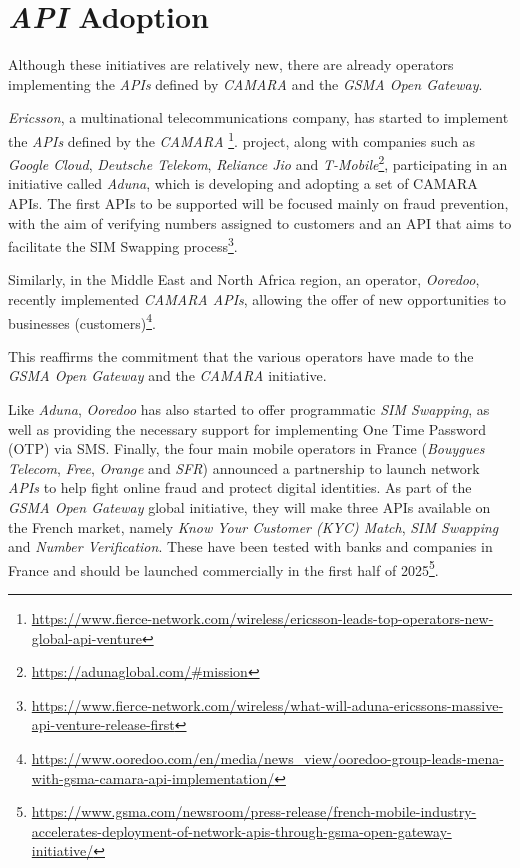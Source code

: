 \section{\emph{API} Adoption} Although these initiatives are
relatively new, there are already operators implementing the
\emph{APIs} defined by \emph{CAMARA} and the \emph{GSMA Open
Gateway}.

\emph{Ericsson}, a multinational telecommunications company, has
started to implement the \emph{APIs} defined by the \emph{CAMARA}
\footnote{\url{https://www.fierce-network.com/wireless/ericsson-leads-top-operators-new-global-api-venture}}.
project, along with companies such as \emph{Google Cloud},
\emph{Deutsche Telekom}, \emph{Reliance Jio} and
\emph{T-Mobile}\footnote{\url{https://adunaglobal.com/\#mission}},
participating in an initiative called \emph{Aduna}, which is
developing and adopting a set of CAMARA APIs. The first APIs to
be supported will be focused mainly on fraud prevention, with the
aim of verifying numbers assigned to customers and an API that
aims to facilitate the SIM Swapping
process\footnote{\url{https://www.fierce-network.com/wireless/what-will-aduna-ericssons-massive-api-venture-release-first}}.

Similarly, in the Middle East and North Africa region, an
operator, \emph{Ooredoo}, recently implemented \emph{CAMARA
APIs}, allowing the offer of new opportunities to businesses
(customers)\footnote{\url{https://www.ooredoo.com/en/media/news_view/ooredoo-group-leads-mena-with-gsma-camara-api-implementation/}}.

This reaffirms the commitment that the various operators have
made to the \emph{GSMA Open Gateway} and the \emph{CAMARA}
initiative.

Like \emph{Aduna}, \emph{Ooredoo} has also started to offer
programmatic \emph{SIM Swapping}, as well as providing the
necessary support for implementing One Time Password (OTP) via
SMS. Finally, the four main mobile operators in France
(\emph{Bouygues Telecom}, \emph{Free}, \emph{Orange} and
\emph{SFR}) announced a partnership to launch network \emph{APIs}
to help fight online fraud and protect digital identities. As
part of the \emph{GSMA Open Gateway} global initiative, they will
make three APIs available on the French market, namely \emph{Know
Your Customer (KYC) Match}, \emph{SIM Swapping} and \emph{Number
Verification}. These have been tested with banks and companies in
France and should be launched commercially in the first half of
2025\footnote{\url{https://www.gsma.com/newsroom/press-release/french-mobile-industry-accelerates-deployment-of-network-apis-through-gsma-open-gateway-initiative/}}.
